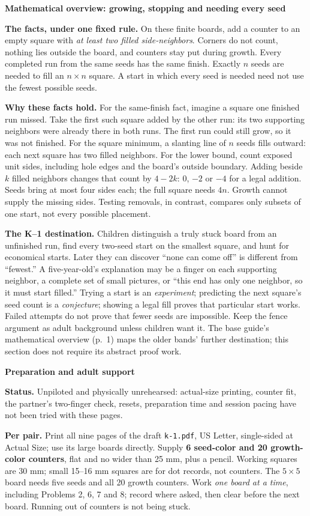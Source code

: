 \documentclass[11pt]{article}
\newcommand{\head}[1]{\par\textbf{\large #1}\par}
\begin{document}
\head{Mathematical overview: growing, stopping and needing every seed}
\textbf{The facts, under one fixed rule.} On these finite boards, add a counter to an empty square with \emph{at least two filled side-neighbors}. Corners do not count, nothing lies outside the board, and counters stay put during growth. Every completed run from the same seeds has the same finish. Exactly $n$ seeds are needed to fill an $n\times n$ square. A start in which every seed is needed need not use the fewest possible seeds.

\textbf{Why these facts hold.} For the same-finish fact, imagine a square one finished run missed. Take the first such square added by the other run: its two supporting neighbors were already there in both runs. The first run could still grow, so it was not finished. For the square minimum, a slanting line of $n$ seeds fills outward: each next square has two filled neighbors. For the lower bound, count exposed unit sides, including hole edges and the board's outside boundary. Adding beside $k$ filled neighbors changes that count by $4-2k$: $0$, $-2$ or $-4$ for a legal addition. Seeds bring at most four sides each; the full square needs $4n$. Growth cannot supply the missing sides. Testing removals, in contrast, compares only subsets of one start, not every possible placement.

\textbf{The K--1 destination.} Children distinguish a truly stuck board from an unfinished run, find every two-seed start on the smallest square, and hunt for economical starts. Later they can discover ``none can come off'' is different from ``fewest.'' A five-year-old's explanation may be a finger on each supporting neighbor, a complete set of small pictures, or ``this end has only one neighbor, so it must start filled.'' Trying a start is an \emph{experiment}; predicting the next square's seed count is a \emph{conjecture}; showing a legal fill proves that particular start works. Failed attempts do not prove that fewer seeds are impossible. Keep the fence argument as adult background unless children want it. The base guide's mathematical overview (p.\ 1) maps the older bands' further destination; this section does not require its abstract proof work.

\head{Preparation and adult support}
\textbf{Status.} Unpiloted and physically unrehearsed: actual-size printing, counter fit, the partner's two-finger check, resets, preparation time and session pacing have not been tried with these pages.

\textbf{Per pair.} Print all nine pages of the draft \texttt{k-1.pdf}, US Letter, single-sided at Actual Size; use its large boards directly. Supply \textbf{6 seed-color and 20 growth-color counters}, flat and no wider than 25 mm, plus a pencil. Working squares are 30 mm; small 15--16 mm squares are for dot records, not counters. The $5\times5$ board needs five seeds and all 20 growth counters. Work \emph{one board at a time}, including Problems 2, 6, 7 and 8; record where asked, then clear before the next board. Running out of counters is not being stuck.
\end{document}
